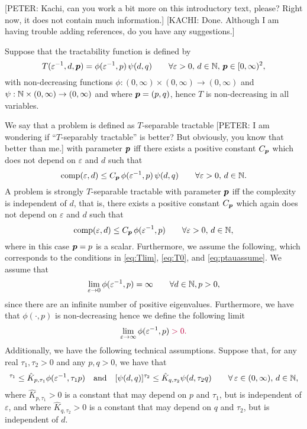 \documentclass[sort&compress]{elsarticle}
\newcommand{\peter}[1]{\begingroup\color{purple}#1\endgroup}
\newcommand{\kachi}[1]{\begingroup\color{ForestGreen}#1\endgroup}
\begin{document}
\peter{[PETER: Kachi, can you work a bit more on this introductory text, please? Right now, it does not contain much information.]}
\kachi{[KACHI: Done. Although I am having trouble adding references, do you have any suggestions.]} 

\begin{example}
Suppose that the tractability function is defined by
\[
 T(\varepsilon^{-1},d,\boldsymbol{p})= \phi(\varepsilon^{-1},p)\, \psi(d,q)
 \qquad \forall \varepsilon > 0, \,  d \in \mathbb{N}, \, \boldsymbol{p} \in [0,\infty)^2,
\]
with non-decreasing functions $\phi : (0,\infty) \times (0,\infty) \to (0,\infty)$ and $\psi : \mathbb{N}  \times (0,\infty) \to (0,\infty)$ and where $\boldsymbol{p} = (p,q)$, hence $T$ is non-decreasing in all variables.

We say that a problem is defined as $T$-separable tractable \peter{[PETER: I am wondering if ``$T$-separably tractable'' is better? But obviously, you know that better than me.]} with parameter $\boldsymbol{p}$ iff there exists a positive constant $C_{\boldsymbol{p}}$ which does not depend on $\varepsilon$ and $d$ such that
\[
\operatorname{comp}(\varepsilon,d) \leq  C_{\boldsymbol{p}} \,  \phi(\varepsilon^{-1},p)\, \psi(d,q)\qquad \forall \varepsilon >0, \, d\in\mathbb{N}.
\]
A problem is strongly $T$-separable tractable with parameter $\boldsymbol{p}$ iff the complexity is independent of $d$, that is, there exists a positive constant $C_{\boldsymbol{p}}$ which again does not depend on $\varepsilon$ and $d$ such that
\[
\operatorname{comp}(\varepsilon,d) \leq C_{\boldsymbol{p}}\,\phi(\varepsilon^{-1},p)\qquad \forall \varepsilon >0, \, d\in\mathbb{N},
\] where in this case $\boldsymbol{p} = p$ is a scalar. 
Furthermore, we assume the following, \peter{which corresponds to the conditions} in \eqref{eq:Tlim}, \eqref{eq:T0}, and \eqref{eq:ptauassume}. We assume that
\[
\lim_{\varepsilon\rightarrow0}\phi(\varepsilon^{-1},p) = \infty \qquad \forall d\in\mathbb{N}, p >0,
\] 
since there are an infinite number of positive eigenvalues. Furthermore, we have that $\phi(\cdot,p)$ is non-decreasing hence we define the following limit
\[ 
\lim_{\varepsilon \rightarrow \infty}\phi(\varepsilon^{-1},p) \peter{>0.}
\] 
Additionally, we have the following technical assumptions. Suppose that, for any real $\tau_1, \tau_2>0$ and any $p,q>0$, we have that 
\begin{align*}
     [\phi(\varepsilon^{-1},p)]^{\tau_1} \le \hat{K}_{p,\tau_1} \phi (\varepsilon^{-1},\tau_1 p)
     \quad \mbox{and} \quad
      [\psi(d,q)]^{\tau_2} \le \hat{K}_{q,\tau_2} \psi (d,\tau_2 q) \qquad \forall \, \varepsilon \in (0,\infty),\, d\in \naturals,
\end{align*} where $\hat{K}_{p,\tau_1}>0$ is a constant that may depend on $p$ and $\tau_1$, but is independent of $\varepsilon$, and where $\hat{K}_{q,\tau_2}>0$ is a constant that may depend on $q$ and $\tau_2$, but is independent of $d$.


\end{example}
\end{document}
